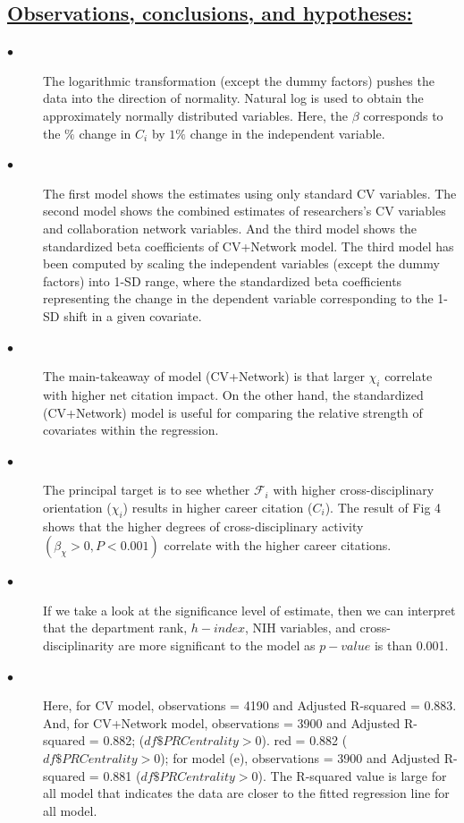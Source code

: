 \documentclass{article}\usepackage[]{graphicx}\usepackage[]{color}
\begin{document}
\subsection*{\underline{Observations, conclusions, and hypotheses:}}
\begin{description}
  \item[$\bullet$] The logarithmic transformation (except the dummy factors) pushes the data into the direction of normality. Natural log is used to obtain the approximately normally distributed variables. Here, the $\beta$ corresponds to the $\%$ change in $C_i$ by $1\%$ change in the independent variable.
  \item[$\bullet$] The first model shows the estimates using only standard CV variables. The second model shows the combined estimates of researchers's CV variables and collaboration network variables. And the third model shows the standardized beta coefficients of CV+Network model. The third model has been computed by scaling the independent variables (except the dummy factors) into 1-SD range, where the standardized beta coefficients representing the change in the dependent variable corresponding to the 1-SD shift in a given covariate.
  \item[$\bullet$] The main-takeaway of model (CV+Network) is that larger $\chi_i$ correlate with higher net citation impact. On the other hand, the standardized (CV+Network) model is useful for comparing the relative strength of covariates within the regression.
  \item[$\bullet$] The principal target is to see whether $\mathcal{F}_i$ with higher cross-disciplinary orientation ($\chi_i$) results in higher career citation ($C_i$). The result of Fig 4 shows that the higher degrees of cross-disciplinary activity $(\beta_{\chi} > 0, P < 0.001)$ correlate with the higher career citations. 
  \item[$\bullet$] If we take a look at the significance level of estimate, then we can interpret that the department rank, $h-index$, NIH variables, and cross-disciplinarity are more significant to the model as $p-value$ is than 0.001. 
  \item[$\bullet$] Here, for CV model, observations = 4190 and Adjusted R-squared = 0.883. And, for CV+Network model, observations = 3900 and Adjusted R-squared = 0.882; ($df\$PRCentrality > 0$). red = 0.882 ($df\$PRCentrality > 0$); for model (e), observations = 3900 and Adjusted R-squared = 0.881 ($df\$PRCentrality > 0$). The R-squared value is large for all model that indicates the data are closer to the fitted regression line for all model. 

\end{description}
\end{document}
